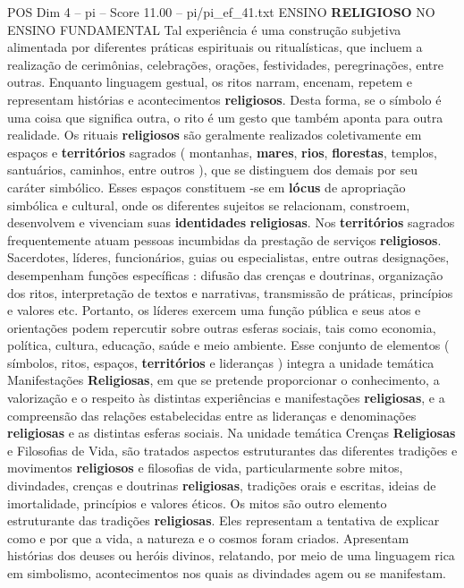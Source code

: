 \begin{textsample}{POS Dim 4 – pi – Score 11.00 – pi/pi\_ef\_41.txt}
ENSINO \textbf{RELIGIOSO} NO ENSINO FUNDAMENTAL Tal experiência é uma construção subjetiva alimentada por diferentes práticas espirituais ou ritualísticas, que incluem a realização de cerimônias, celebrações, orações, festividades, peregrinações, entre outras.
Enquanto linguagem gestual, os ritos narram, encenam, repetem e representam histórias e acontecimentos \textbf{religiosos}.
Desta forma, se o símbolo é uma coisa que significa outra, o rito é um gesto que também aponta para outra realidade.
Os rituais \textbf{religiosos} são geralmente realizados coletivamente em espaços e \textbf{territórios} sagrados ( montanhas, \textbf{mares}, \textbf{rios}, \textbf{florestas}, templos, santuários, caminhos, entre outros ), que se distinguem dos demais por seu caráter simbólico.
Esses espaços constituem -se em \textbf{lócus} de apropriação simbólica e cultural, onde os diferentes sujeitos se relacionam, constroem, desenvolvem e vivenciam suas \textbf{identidades} \textbf{religiosas}.
Nos \textbf{territórios} sagrados frequentemente atuam pessoas incumbidas da prestação de serviços \textbf{religiosos}.
Sacerdotes, líderes, funcionários, guias ou especialistas, entre outras designações, desempenham funções específicas : difusão das crenças e doutrinas, organização dos ritos, interpretação de textos e narrativas, transmissão de práticas, princípios e valores etc.
Portanto, os líderes exercem uma função pública e seus atos e orientações podem repercutir sobre outras esferas sociais, tais como economia, política, cultura, educação, saúde e meio ambiente.
Esse conjunto de elementos ( símbolos, ritos, espaços, \textbf{territórios} e lideranças ) integra a unidade temática Manifestações \textbf{Religiosas}, em que se pretende proporcionar o conhecimento, a valorização e o respeito às distintas experiências e manifestações \textbf{religiosas}, e a compreensão das relações estabelecidas entre as lideranças e denominações \textbf{religiosas} e as distintas esferas sociais.
Na unidade temática Crenças \textbf{Religiosas} e Filosofias de Vida, são tratados aspectos estruturantes das diferentes tradições e movimentos \textbf{religiosos} e filosofias de vida, particularmente sobre mitos, divindades, crenças e doutrinas \textbf{religiosas}, tradições orais e escritas, ideias de imortalidade, princípios e valores éticos.
Os mitos são outro elemento estruturante das tradições \textbf{religiosas}.
Eles representam a tentativa de explicar como e por que a vida, a natureza e o cosmos foram criados.
Apresentam histórias dos deuses ou heróis divinos, relatando, por meio de uma linguagem rica em simbolismo, acontecimentos nos quais as divindades agem ou se manifestam.

\end{textsample}

